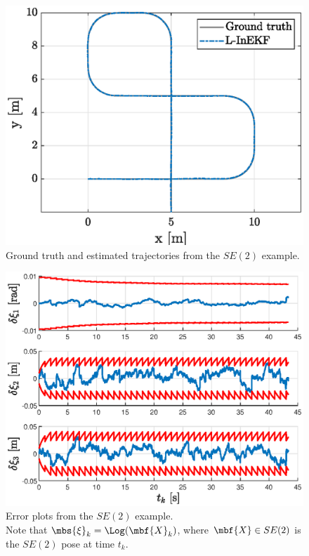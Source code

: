 \documentclass[nobib]{tufte-handout}
\begin{document}
    \begin{figure}[h]
        \centering
        \includegraphics[width=\textwidth]{figs/se2_example_trajectories.eps}
        \caption{Ground truth and estimated trajectories from the $SE(2)$ example.}
        \label{fig:se2_example_trajectories}
    \end{figure}

    \begin{figure}[h]
        \centering
        \includegraphics[width=\textwidth]{figs/se2_example_error_plots.eps}
        \caption{Error plots from the $SE(2)$ example.\\ Note that $\mbs{\xi}_{k} = \Log(\mbf{X}_{k})$, where $\mbf{X}\in SE(2)$ is the $SE(2)$ pose at time $t_{k}$.}
        \label{fig:se2_example_error_plots}
    \end{figure}


    \clearpage
    
    
\end{document}
